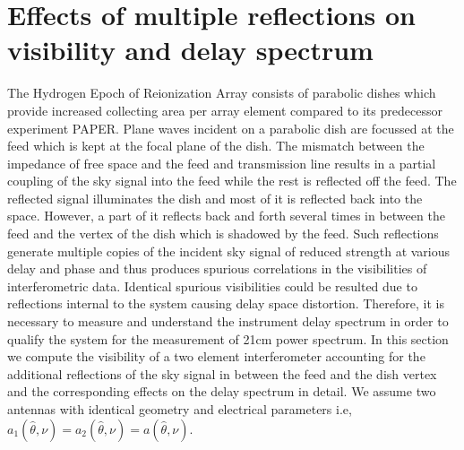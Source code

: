 \documentclass[twocolumn]{emulateapj}
\newcommand{\bmvolt}{{a}}
\newcommand{\thhat}{{\hat\theta}}
\begin{document}
\section{\textbf{Effects of multiple reflections on visibility and delay spectrum}}
The Hydrogen Epoch of Reionization Array consists of parabolic dishes which provide increased collecting area per array element compared to its predecessor experiment PAPER. Plane waves incident on a parabolic dish are focussed at the feed which is kept at the focal plane of the dish.
The mismatch between the impedance of free space and the feed and transmission line results in a partial coupling of the sky signal into the feed while the rest is reflected off the feed. 
The reflected signal illuminates the dish and most of it is reflected back into the space.
However, a part of it reflects back and forth several times in between the feed and the vertex of the dish which is shadowed by the feed.
Such reflections generate multiple copies of the incident sky signal of reduced strength at various delay and phase and thus produces spurious correlations in the visibilities of interferometric data.  Identical spurious visibilities could be resulted due to reflections internal to the system causing delay space distortion. Therefore, it is necessary to measure and understand the instrument delay spectrum in order to qualify the system for the measurement of 21cm power spectrum. 
In this section we compute the visibility of a two element interferometer accounting for the additional reflections of the sky signal in between the feed and the dish vertex and the corresponding effects on the delay spectrum in detail. We assume two antennas with identical geometry and electrical parameters i.e, $\bmvolt_{1}(\thhat,\nu)=\bmvolt_{2}(\thhat,\nu) = \bmvolt(\thhat,\nu)$. 
\end{document}

